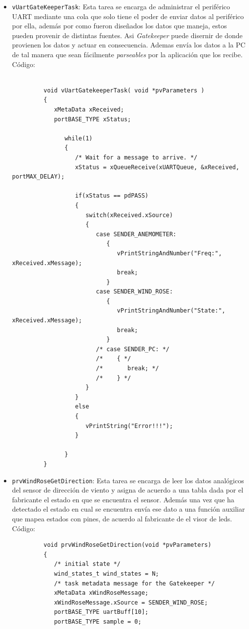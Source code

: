 \documentclass[10pt]{article}
\begin{document}
\begin{itemize}
\begin{verbatim}
         }
      \end{verbatim}
   \item \verb|vUartGateKeeperTask|: Esta tarea se encarga de administrar el periférico UART mediante una cola que solo tiene el poder de enviar datos al periférico por ella, además por como fueron diseñados los datos que maneja, estos pueden provenir de distintas fuentes. Asi \textit{Gatekeeper} puede disernir de donde provienen los datos y actuar en consecuencia. Ademas envía los datos a la PC de tal manera que sean fácilmente \textit{parseables} por la aplicación que los recibe. Código:
      \begin{verbatim}

         void vUartGatekeeperTask( void *pvParameters )
         {
            xMetaData xReceived;
            portBASE_TYPE xStatus;

               while(1)
               {
                  /* Wait for a message to arrive. */
                  xStatus = xQueueReceive(xUARTQueue, &xReceived, portMAX_DELAY);

                  if(xStatus == pdPASS)
                  {
                     switch(xReceived.xSource)
                     {
                        case SENDER_ANEMOMETER:
                           {
                              vPrintStringAndNumber("Freq:", xReceived.xMessage);
                              break;
                           }
                        case SENDER_WIND_ROSE:
                           {
                              vPrintStringAndNumber("State:", xReceived.xMessage);
                              break;
                           }
                        /* case SENDER_PC: */
                        /*    { */
                        /*       break; */
                        /*    } */
                     }
                  }
                  else
                  {
                     vPrintString("Error!!!");
                  }

               }
         }
      \end{verbatim}
   \item \verb|prvWindRoseGetDirection|: Esta tarea se encarga de leer los datos analógicos del sensor de dirección de viento y asigna de acuerdo a una tabla dada por el fabricante el estado en que se encuentra el sensor. Además una vez que ha detectado el estado en cual se encuentra envía ese dato a una función auxiliar que mapea estados con pines, de acuerdo al fabricante de el visor de leds. Código:
      \begin{verbatim}
         void prvWindRoseGetDirection(void *pvParameters)
         {
            /* initial state */
            wind_states_t wind_states = N;
            /* task metadata message for the Gatekeeper */
            xMetaData xWindRoseMessage;
            xWindRoseMessage.xSource = SENDER_WIND_ROSE;
            portBASE_TYPE uartBuff[10];
            portBASE_TYPE sample = 0;


\end{verbatim}
\end{itemize}
\end{document}
